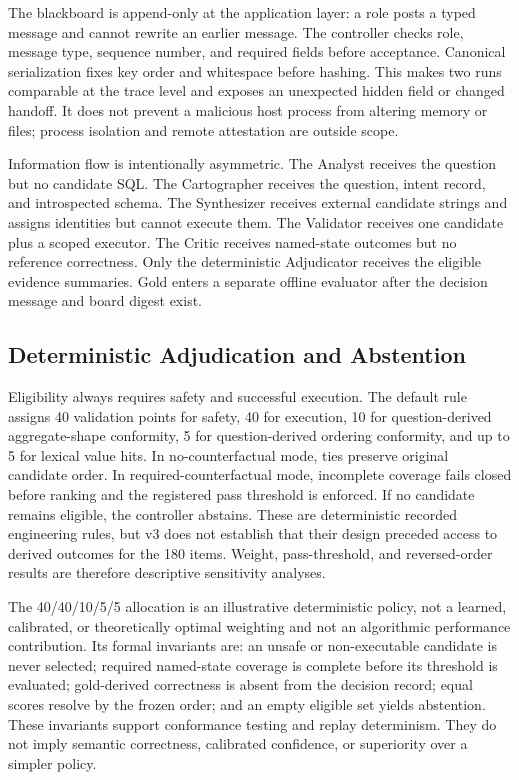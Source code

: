 \documentclass[applsci,article,submit,moreauthors]{Definitions/mdpi}
\begin{document}
The blackboard is append-only at the application layer: a role posts a typed message and cannot rewrite an earlier message. The controller checks role, message type, sequence number, and required fields before acceptance. Canonical serialization fixes key order and whitespace before hashing. This makes two runs comparable at the trace level and exposes an unexpected hidden field or changed handoff. It does not prevent a malicious host process from altering memory or files; process isolation and remote attestation are outside scope.

Information flow is intentionally asymmetric. The Analyst receives the question but no candidate SQL. The Cartographer receives the question, intent record, and introspected schema. The Synthesizer receives external candidate strings and assigns identities but cannot execute them. The Validator receives one candidate plus a scoped executor. The Critic receives named-state outcomes but no reference correctness. Only the deterministic Adjudicator receives the eligible evidence summaries. Gold enters a separate offline evaluator after the decision message and board digest exist.

\subsection{Deterministic Adjudication and Abstention}

Eligibility always requires safety and successful execution. The default rule assigns 40 validation points for safety, 40 for execution, 10 for question-derived aggregate-shape conformity, 5 for question-derived ordering conformity, and up to 5 for lexical value hits. In no-counterfactual mode, ties preserve original candidate order. In required-counterfactual mode, incomplete coverage fails closed before ranking and the registered pass threshold is enforced. If no candidate remains eligible, the controller abstains. These are deterministic recorded engineering rules, but v3 does not establish that their design preceded access to derived outcomes for the 180 items. Weight, pass-threshold, and reversed-order results are therefore descriptive sensitivity analyses.

The 40/40/10/5/5 allocation is an illustrative deterministic policy, not a learned, calibrated, or theoretically optimal weighting and not an algorithmic performance contribution. Its formal invariants are: an unsafe or non-executable candidate is never selected; required named-state coverage is complete before its threshold is evaluated; gold-derived correctness is absent from the decision record; equal scores resolve by the frozen order; and an empty eligible set yields abstention. These invariants support conformance testing and replay determinism. They do not imply semantic correctness, calibrated confidence, or superiority over a simpler policy.
\end{document}
